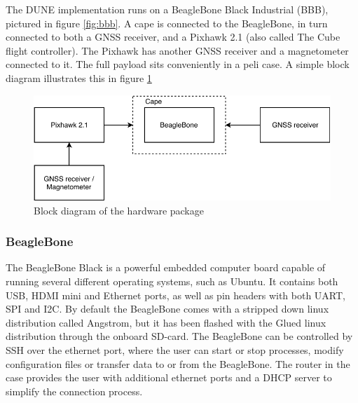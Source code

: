     The DUNE implementation runs on a BeagleBone Black Industrial (BBB), pictured in figure \ref{fig:bbb}. A cape is connected to the BeagleBone, in turn connected to both a GNSS receiver, and a Pixhawk 2.1 (also called The Cube flight controller). The Pixhawk has another GNSS receiver and a magnetometer connected to it. The full payload sits conveniently in a peli case. A simple block diagram illustrates this in figure \ref{fig:hardware-connection-diagram}\\
    
    \begin{figure}
        \centering
        \includegraphics{Implementation/Images/hardware-schematic.pdf}
        \caption{Block diagram of the hardware package}
        \label{fig:hardware-connection-diagram}
    \end{figure}
    
    \subsubsection{BeagleBone}
    The BeagleBone Black is a powerful embedded computer board capable of running several different operating systems, such as Ubuntu. It contains both USB, HDMI mini and Ethernet ports, as well as pin headers with both UART, SPI and I2C. By default the BeagleBone comes with a stripped down linux distribution called Angstrom, but it has been flashed with the Glued linux distribution through the onboard SD-card. The BeagleBone can be controlled by SSH over the ethernet port, where the user can start or stop processes, modify configuration files or transfer data to or from the BeagleBone. The router in the case provides the user with additional ethernet ports and a DHCP server to simplify the connection process.\\
    
